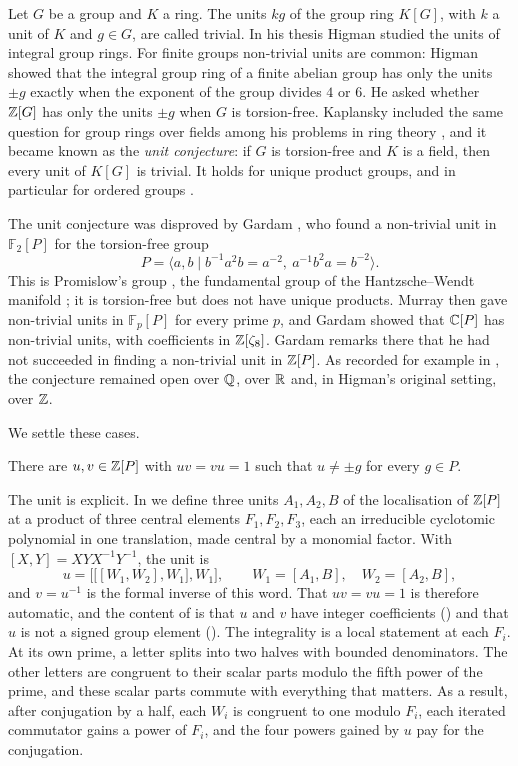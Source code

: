 \documentclass[11pt,colorlinks]{charlie}
\newcommand{\F}{\mathbb{F}}
\begin{document}
Let $G$ be a group and $K$ a ring. The units $kg$ of the group ring $K[G]$, with $k$ a unit of $K$ and $g\in G$, are called trivial. In his thesis Higman \cite{Higman} studied the units of integral group rings. For finite groups non-trivial units are common: Higman showed that the integral group ring of a finite abelian group has only the units $\pm g$ exactly when the exponent of the group divides $4$ or $6$. He asked whether $\mathbb{Z}[G]$ has only the units $\pm g$ when $G$ is torsion-free. Kaplansky included the same question for group rings over fields among his problems in ring theory \cite{Kaplansky57,Kaplansky70}, and it became known as the \emph{unit conjecture}: if $G$ is torsion-free and $K$ is a field, then every unit of $K[G]$ is trivial. It holds for unique product groups, and in particular for ordered groups \cite{Higman,Passman}.

The unit conjecture was disproved by Gardam \cite{Gardam21}, who found a non-trivial unit in $\F_2[P]$ for the torsion-free group
\[
  P=\langle a,b\mid b^{-1}a^2b=a^{-2},\ a^{-1}b^2a=b^{-2}\rangle .
\]
This is Promislow's group \cite{Promislow}, the fundamental group of the Hantzsche--Wendt manifold \cite{HW}; it is torsion-free but does not have unique products. Murray \cite{Murray} then gave non-trivial units in $\F_p[P]$ for every prime $p$, and Gardam \cite{Gardam24} showed that $\mathbb{C}[P]$ has non-trivial units, with coefficients in $\mathbb{Z}[\zeta_8]$. Gardam remarks there that he had not succeeded in finding a non-trivial unit in $\mathbb{Z}[P]$. As recorded for example in \cite{Tabei}, the conjecture remained open over $\mathbb{Q}$, over $\mathbb{R}$ and, in Higman's original setting, over $\mathbb{Z}$.

We settle these cases.

\begin{theorem}\label{thm:main}
There are $u,v\in\mathbb{Z}[P]$ with $uv=vu=1$ such that $u\ne\pm g$ for every $g\in P$.
\end{theorem}

The unit is explicit. In  we define three units $A_1,A_2,B$ of the localisation of $\mathbb{Z}[P]$ at a product of three central elements $F_1,F_2,F_3$, each an irreducible cyclotomic polynomial in one translation, made central by a monomial factor. With $[X,Y]=XYX^{-1}Y^{-1}$, the unit is
\begin{equation}\label{eq:u}
  u=\bigl[\bigl[[W_1,W_2],W_1\bigr],W_1\bigr],\qquad W_1=[A_1,B],\quad W_2=[A_2,B],
\end{equation}
and $v=u^{-1}$ is the formal inverse of this word. That $uv=vu=1$ is therefore automatic, and the content of  is that $u$ and $v$ have integer coefficients () and that $u$ is not a signed group element (). The integrality is a local statement at each $F_i$. At its own prime, a letter splits into two halves with bounded denominators. The other letters are congruent to their scalar parts modulo the fifth power of the prime, and these scalar parts commute with everything that matters. As a result, after conjugation by a half, each $W_i$ is congruent to one modulo $F_i$, each iterated commutator gains a power of $F_i$, and the four powers gained by $u$ pay for the conjugation.
\end{document}
